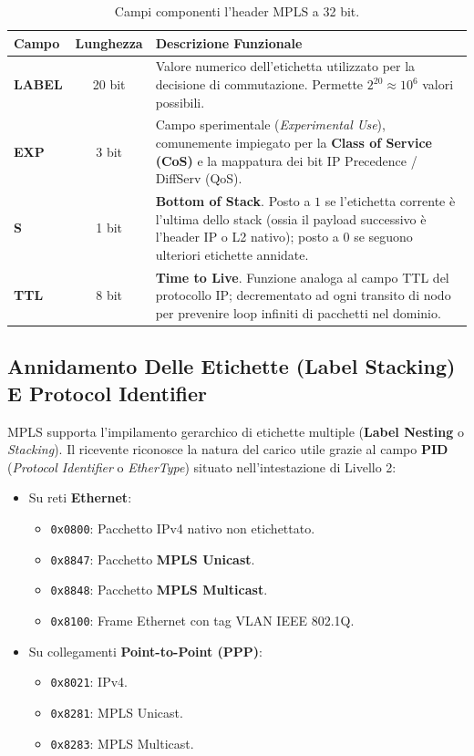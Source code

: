 \documentclass[11pt, a4paper]{article}
\begin{document}
\begin{table}[H]
\centering
\small
\begin{tabularx}{\textwidth}{l c X}
\toprule
\textbf{Campo} & \textbf{Lunghezza} & \textbf{Descrizione Funzionale} \\
\midrule
\textbf{LABEL} & 20 bit & Valore numerico dell'etichetta utilizzato per la decisione di commutazione. Permette $2^{20} \approx 10^6$ valori possibili. \\
\textbf{EXP}   & 3 bit  & Campo sperimentale (\emph{Experimental Use}), comunemente impiegato per la \textbf{Class of Service (CoS)} e la mappatura dei bit IP Precedence / DiffServ (QoS). \\
\textbf{S}     & 1 bit  & \textbf{Bottom of Stack}. Posto a $1$ se l'etichetta corrente è l'ultima dello stack (ossia il payload successivo è l'header IP o L2 nativo); posto a $0$ se seguono ulteriori etichette annidate. \\
\textbf{TTL}   & 8 bit  & \textbf{Time to Live}. Funzione analoga al campo TTL del protocollo IP; decrementato ad ogni transito di nodo per prevenire loop infiniti di pacchetti nel dominio. \\
\bottomrule
\end{tabularx}
\caption{Campi componenti l'header MPLS a 32 bit.}
\end{table}

\subsection{Annidamento Delle Etichette (Label Stacking) E Protocol Identifier}
MPLS supporta l'impilamento gerarchico di etichette multiple (\textbf{Label Nesting} o \emph{Stacking}). Il ricevente riconosce la natura del carico utile grazie al campo \textbf{PID} (\emph{Protocol Identifier} o \emph{EtherType}) situato nell'intestazione di Livello 2:
\begin{itemize}[noitemsep]
    \item Su reti \textbf{Ethernet}:
    \begin{itemize}[noitemsep]
        \item \texttt{0x0800}: Pacchetto IPv4 nativo non etichettato.
        \item \texttt{0x8847}: Pacchetto \textbf{MPLS Unicast}.
        \item \texttt{0x8848}: Pacchetto \textbf{MPLS Multicast}.
        \item \texttt{0x8100}: Frame Ethernet con tag VLAN IEEE 802.1Q.
    \end{itemize}
    \item Su collegamenti \textbf{Point-to-Point (PPP)}:
    \begin{itemize}[noitemsep]
        \item \texttt{0x8021}: IPv4.
        \item \texttt{0x8281}: MPLS Unicast.
        \item \texttt{0x8283}: MPLS Multicast.
    \end{itemize}
\end{itemize}
\end{document}
